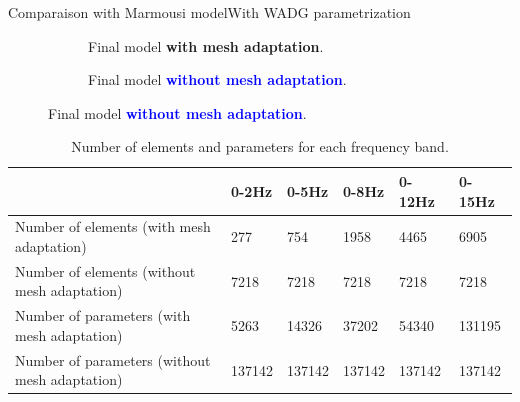 
\begin{frame}{Comparaison with Marmousi model}{With WADG parametrization}
  \vspace{-0.8cm}
  \setlength{\modelwidth}{6.0cm}
  \begin{figure}[!htbp]
    \renewcommand{\modelfile}{image/mesh_adapt/wadg_adapt_vp_80}
     \begin{subfigure}[!htbp]{0.5\textwidth}
        \vspace{0.5cm}
        \hspace{-0.5cm}
         \centering
         
         \caption*{Final model \textcolor{\mygreen}{\textbf{with mesh adaptation}}.}
         \label{marmousi_mesh_padapt}
     \end{subfigure}
     \hspace{-1cm}
     \renewcommand{\modelfile}{image/mesh_adapt/wadg_classic_vp_80}
     \renewcommand{\cmapmin}{1500}
     \renewcommand{\cmapmax}{5000}
     \begin{subfigure}[!htbp]{0.5\textwidth}
         \centering
         
         \vspace{-0.6cm}
                  \caption*{Final model \textcolor{blue}{\textbf{without mesh adaptation}}.}
     \end{subfigure}
  \end{figure}

  \scriptsize
  \begin{table}[!htbp]
\centering
\begin{tabular}{|m{3.5cm}|l|l|l|l|l|}
\hline
& 0-2Hz & 0-5Hz & 0-8Hz & 0-12Hz & 0-15Hz  \\ \hline
\rowcolor{green!30}
Number of elements \newline (with mesh adaptation)      & 277    & 754     & 1958    & 4465     & 6905  \\ \hline
\rowcolor{blue!30}
Number of elements \newline (without mesh adaptation)      & 7218    & 7218     & 7218    & 7218     & 7218  \\ \hline
\rowcolor{green!30}
Number of parameters \newline (with mesh adaptation)      & 5263    & 14326     &  37202   & 54340     & 131195  \\ \hline
\rowcolor{blue!30}
Number of parameters \newline (without mesh adaptation)      & 137142    & 137142     & 137142    & 137142     & 137142  \\ \hline
\end{tabular}
\caption*{Number of elements and parameters for each frequency band.}
\label{nb_elem_mesh_adapt_wadg}
\end{table}
\end{frame}


